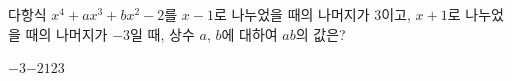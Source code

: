 다항식 $x^4+ax^3+bx^2-2$를 $x-1$로 나누었을 때의 나머지가 $3$이고, $x+1$로 나누었을 때의 나머지가 $-3$일 때, 상수 $a$, $b$에 대하여 $ab$의 값은?
\begin{choices32}{$-3$}{$-2$}{$1$}{$2$}{$3$}\end{choices32}
